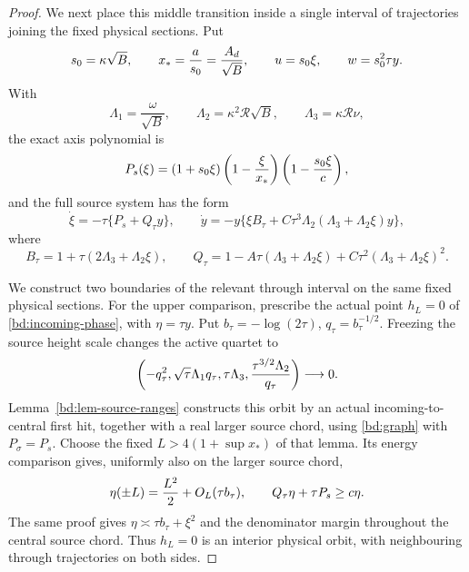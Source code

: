 \begin{proof}
We next place this middle transition inside a single interval of
trajectories joining the fixed physical sections.  Put
\begin{equation}
 s_0=\kappa\sqrt B,\qquad
 x_*={a\over s_0}={A_d\over\sqrt B},\qquad
 u=s_0\xi,\qquad w=s_0^2\tau y.
 \label{deg:degree-parabolic-dictionary}
\end{equation}
With
\[
 \Lambda_1=\frac{\omega}{\sqrt B},\qquad
 \Lambda_2=\kappa^2\mathcal R\sqrt B,\qquad
 \Lambda_3=\kappa\mathcal R\nu,
\]
the exact axis polynomial is
\begin{equation}
 P_s(\xi)=(1+s_0\xi)
       \left(1-{\xi\over x_*}\right)
       \left(1-{s_0\xi\over c}\right),
 \label{deg:degree-source-polynomial}
\end{equation}
and the full source system has the form
\begin{equation}
 \dot\xi=-\tau\{P_s+Q_\tau y\},\qquad
 \dot y=-y\{\xi B_\tau+C\tau^3\Lambda_2
                   (\Lambda_3+\Lambda_2\xi)y\},
 \label{deg:degree-source-field}
\end{equation}
where
\[
 B_\tau=1+\tau(2\Lambda_3+\Lambda_2\xi),\qquad
 Q_\tau=1-A\tau(\Lambda_3+\Lambda_2\xi)
          +C\tau^2(\Lambda_3+\Lambda_2\xi)^2.
\]

We construct two boundaries of the relevant through interval on the
same fixed physical sections.  For the upper comparison, prescribe the
actual point \(h_L=0\) of \eqref{bd:incoming-phase}, with
\(\eta=\tau y\).  Put
\(b_\tau=-\log(2\tau)\), \(q_\tau=b_\tau^{-1/2}\).
Freezing the source height scale changes the active quartet to
\begin{equation}
 \left(-q_\tau^2,\sqrt\tau\Lambda_1q_\tau,
       \tau\Lambda_3,{\tau^{3/2}\Lambda_2\over q_\tau}\right)
       \longrightarrow0.
 \label{deg:degree-zero-source}
\end{equation}
Lemma~\ref{bd:lem-source-ranges} constructs this orbit by an actual
incoming-to-central first hit, together with a real larger source
chord, using \eqref{bd:graph} with \(P_\sigma=P_s\).
Choose the fixed \(L>4(1+\sup x_*)\) of that lemma. Its energy
comparison gives, uniformly also on the larger source chord,
\begin{equation}
 \eta(\pm L)={L^2\over2}+O_L(\tau b_\tau),\qquad
 Q_\tau\eta+\tau P_s\ge c\eta .
 \label{deg:degree-zero-cuts}
\end{equation}
The same proof gives
\(\eta\asymp\tau b_\tau+\xi^2\) and the denominator margin
throughout the central source chord.  Thus \(h_L=0\) is an interior physical orbit, with neighbouring
through trajectories on both sides.


\end{proof}
